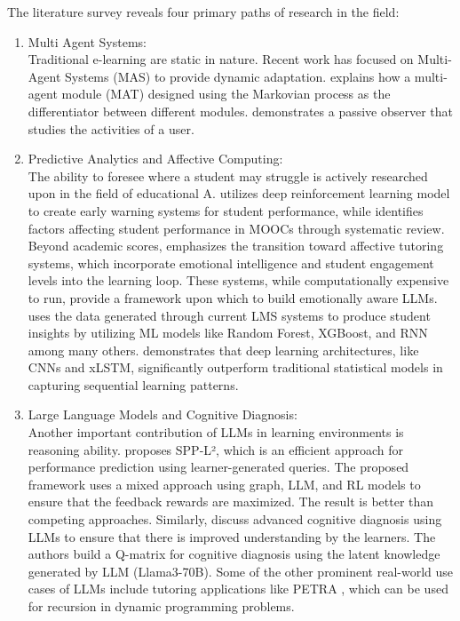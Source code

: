 \documentclass[conference]{IEEEtran}
\begin{document}

The literature survey reveals four primary paths of research in the field:

\begin{enumerate}
	\item Multi Agent Systems: \\
	Traditional e-learning are static in nature. Recent work has focused on Multi-Agent Systems (MAS) to provide dynamic adaptation. \textcite{zakaria2025} explains how a multi-agent module (MAT) designed using the Markovian process as the differentiator between different modules. \textcite{vukovic2021} demonstrates a passive observer that studies the activities of a user.
	
	\item Predictive Analytics and Affective Computing: \\
	The ability to foresee where a student may struggle is actively researched upon in the field of educational A. \textcite{bagunaid2024} utilizes deep reinforcement learning model to create early warning systems for student performance, while \textcite{rizwan2025} identifies factors affecting student performance in MOOCs through systematic review. Beyond academic scores, \textcite{hasan2020} emphasizes the transition toward affective tutoring systems, which incorporate emotional intelligence and student engagement levels \cite{ayouni2021} into the learning loop. These systems, while computationally expensive to run, provide a framework upon which to build emotionally aware LLMs. 
	\textcite{mahafdah2024} uses the data generated through current LMS systems to produce student insights by utilizing ML models like Random Forest, XGBoost, and RNN among many others. \textcite{aderghal2025} demonstrates that deep learning architectures, like CNNs and xLSTM, significantly outperform traditional statistical models in capturing sequential learning patterns.
	
	\item Large Language Models and Cognitive Diagnosis: \\
	Another important contribution of LLMs in learning environments is reasoning ability. \textcite{zhang2025} proposes SPP-L², which is an efficient approach for performance prediction using learner-generated queries. The proposed framework uses a mixed approach using graph, LLM, and RL models to ensure that the feedback rewards are maximized. The result is better than competing approaches. Similarly, \textcite{chen2025} discuss advanced cognitive diagnosis using LLMs to ensure that there is improved understanding by the learners. The authors build a Q-matrix for cognitive diagnosis using the latent knowledge generated by LLM (Llama3-70B). Some of the other prominent real-world use cases of LLMs include tutoring applications like PETRA \cite{hewedy2025}, which can be used for recursion in dynamic programming problems.
	

\end{enumerate}
\end{document}
